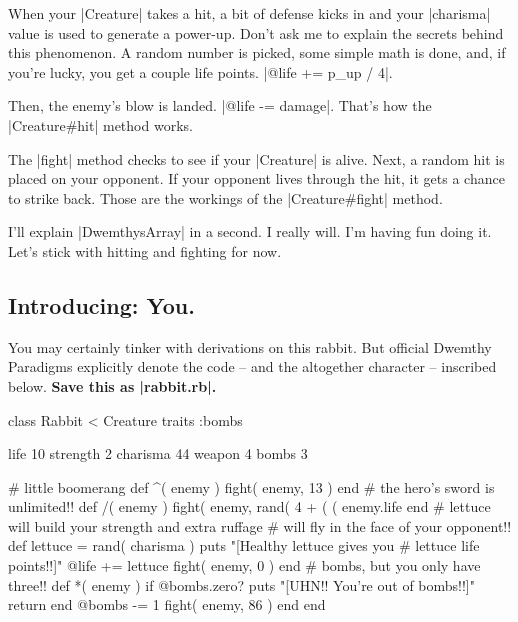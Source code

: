 \documentclass[12pt,twoside]{report}
\begin{document}
When your \rubyinline|Creature| takes a hit, a bit of
defense kicks in and your \rubyinline|charisma| value
is used to generate a power-up.  Don't ask me to explain the secrets
behind this phenomenon.  A random number is picked, some simple math
is done, and, if you're lucky, you get a couple life points.
\rubyinline|@life += p_up / 4|.

Then, the enemy's blow is landed.  
\rubyinline|@life -= damage|.  
That's how the \rubyinline|Creature#hit|
method works.

The \rubyinline|fight| method checks to see if your
\rubyinline|Creature| is alive.  Next, a random hit is
placed on your opponent.  If your opponent lives through the hit, it
gets a chance to strike back.  Those are the workings of the
\rubyinline|Creature#fight| method.

I'll explain \rubyinline|DwemthysArray| in a second.
I really will.  I'm having fun doing it. Let's stick with hitting and
fighting for now.



\subsection{Introducing: You.}



You may certainly tinker with derivations on this rabbit.  But
official Dwemthy Paradigms explicitly denote the code -- and the
altogether character -- inscribed below.  {\bf Save this as
  \rubyinline|rabbit.rb|.}


\begin{rubycode}

 class Rabbit < Creature
   traits :bombs

   life 10
   strength 2
   charisma 44
   weapon 4
   bombs 3

   # little boomerang
   def ^( enemy )
     fight( enemy, 13 )
   end
   # the hero's sword is unlimited!!
   def /( enemy )
     fight( enemy, rand( 4 + ( ( enemy.life %
   end
   # lettuce will build your strength and extra ruffage
   # will fly in the face of your opponent!!
   def %
     lettuce = rand( charisma )
     puts "[Healthy lettuce gives you #{ lettuce } life points!!]"
     @life += lettuce
     fight( enemy, 0 )
   end
   # bombs, but you only have three!!
   def *( enemy )
     if @bombs.zero?
       puts "[UHN!! You're out of bombs!!]"
       return
     end
     @bombs -= 1
     fight( enemy, 86 )
   end
 end

\end{rubycode}
\end{document}
